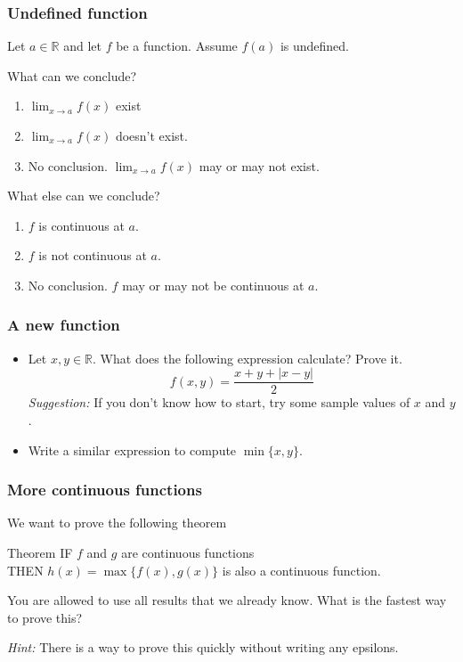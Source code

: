 \documentclass[14pt]{beamer}
\newcommand {\DS} [1] {${\displaystyle #1}$}
\newcommand {\R}{\mathbb{R}}
\newcommand{\p}{\pause}
\newcommand{\setsize}[1]{\fontsize{#1}{#1}\selectfont} %
\newcommand{\smallerfont}{\setsize{13}} %
\begin{document}
\begin{frame}[t]
\frametitle{Undefined function}
\smallerfont
Let $a \in \R$ and let $f$ be a function.   Assume $f(a)$ is undefined.

\vfill

\begin{block}{What can we conclude?}
	\begin{enumerate}
		\item  \DS{\lim_{x \to a} f(x)} exist
		\item  \DS{\lim_{x \to a} f(x)} doesn't exist.
		\item   No conclusion.  \DS{\lim_{x \to a} f(x)} may or may not exist.
	\end{enumerate}
\end{block}

\vfill

\begin{block}{What else can we conclude?}
	\begin{enumerate} \addtocounter{enumi}{3}
		\item  $f$ is continuous at $a$.
		\item  $f$ is not continuous at $a$.
		\item  No conclusion. $f$ may or may not be continuous at $a$.
	\end{enumerate}
\end{block}

\vfill
	
\end{frame}

\begin{frame}
\frametitle{A new function}

\begin{itemize}
\item Let $x, y \in \R$.  What does the following expression calculate?  Prove it.
	$$
		f(x,y) = \frac{x + y + |x - y|}{2}
	$$
\emph{Suggestion:}  If you don't know how to start, try some sample values of $x$ and $y$.
\vfill  \p

\item Write a similar expression to compute \DS{\min \{ x, y \}}.
\end{itemize}
\vfill

\end{frame}
\begin{frame}
\frametitle{More continuous functions}

We want to prove the following theorem
\begin{block}{Theorem}
IF $f$ and $g$ are continuous functions \\
THEN $h(x) = \max \{ f(x), g(x) \}$ is also a continuous function.
\end{block}

You are allowed to use all results that we already know.  What is the fastest way to prove this?


\vfill


\emph{Hint:}  
There is a way to prove this quickly without writing any epsilons.

\vfill

\end{frame}
\end{document}
